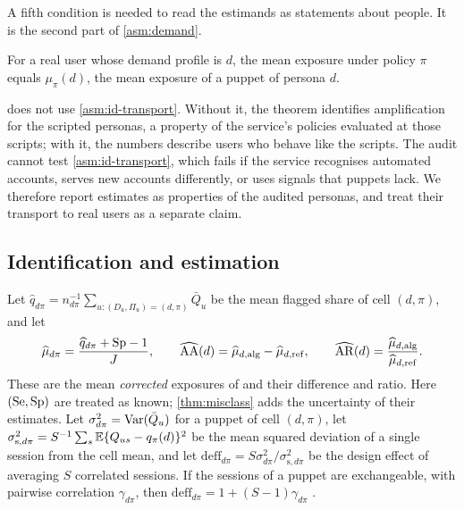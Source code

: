 A fifth condition is needed to read the estimands as statements about people. It is the second part of \cref{asm:demand}.

\begin{assumption}\label{asm:id-transport}
For a real user whose demand profile is $d$, the mean exposure under policy $\pi$ equals $\mu_\pi(d)$, the mean exposure of a puppet of persona $d$.
\end{assumption}

 does not use \cref{asm:id-transport}. Without it, the theorem identifies amplification for the scripted personas, a property of the service's policies evaluated at those scripts; with it, the numbers describe users who behave like the scripts. The audit cannot test \cref{asm:id-transport}, which fails if the service recognises automated accounts, serves new accounts differently, or uses signals that puppets lack. We therefore report estimates as properties of the audited personas, and treat their transport to real users as a separate claim.

\subsection{Identification and estimation}\label{sec:id-theorem}

Let $\widehat q_{d\pi}=n_{d\pi}^{-1}\sum_{u:(D_u,\Pi_u)=(d,\pi)}\bar Q_u$ be the mean flagged share of cell $(d,\pi)$, and let
\begin{equation}\label{eq:id-est}
  \widehat\mu_{d\pi}=\frac{\widehat q_{d\pi}+\mathrm{Sp}-1}{J},\qquad
  \widehat{\mathrm{AA}}(d)=\widehat\mu_{d,\mathrm{alg}}-\widehat\mu_{d,\mathrm{ref}},\qquad
  \widehat{\mathrm{AR}}(d)=\frac{\widehat\mu_{d,\mathrm{alg}}}{\widehat\mu_{d,\mathrm{ref}}}.
\end{equation}
These are the mean \emph{corrected} exposures of \citet{rogangladen1978} and their difference and ratio. Here $(\mathrm{Se},\mathrm{Sp})$ are treated as known; \cref{thm:misclass} adds the uncertainty of their estimates. Let $\sigma^2_{d\pi}=\operatorname{Var}(\bar Q_u)$ for a puppet of cell $(d,\pi)$, let $\sigma^2_{\mathrm s,d\pi}=S^{-1}\sum_s\mathbb{E}\{Q_{us}-q_\pi(d)\}^2$ be the mean squared deviation of a single session from the cell mean, and let $\mathrm{deff}_{d\pi}=S\sigma^2_{d\pi}/\sigma^2_{\mathrm s,d\pi}$ be the design effect of averaging $S$ correlated sessions. If the sessions of a puppet are exchangeable, with pairwise correlation $\gamma_{d\pi}$, then $\mathrm{deff}_{d\pi}=1+(S-1)\gamma_{d\pi}$ \citep{kish1965}.

